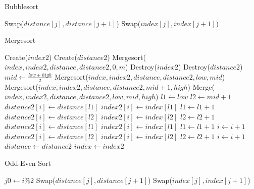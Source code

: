 \documentclass[10pt]{article}
\begin{document}
\begin{algorithm}[H]
\caption{Bubblesort}\label{alg:bubblesort}
\begin{algorithmic}[1]
				\State Swap($distance[j],distance[j+1]$)
				\State Swap($index[j],index[j+1]$)
			\EndIf
		\EndFor
	\EndFor
\EndProcedure
\end{algorithmic}
\end{algorithm}
\begin{algorithm}[H]
\caption{Mergesort}\label{alg:mergesort}
\begin{algorithmic}[1]
	\State Create($index2$)
	\State Create($distance2$)
	\State Mergesort($index,index2,distance,distance2,0,m$)
	\State Destroy($index2$)
	\State Destroy($distance2$)
\EndProcedure
{}
		\State $mid \gets \frac{low+high}{2}$
		\State Mergesort($index,index2,distance,distance2,low,mid$)
		\State Mergesort($index,index2,distance,distance2,mid+1,high$)
		\State Merge($index,index2,distance,distance2,low,mid,high$)
	\EndIf
\EndProcedure
{}
	\State $l1 \gets low$
	\State $l2 \gets mid+1$
			\State $distance2[i] \gets distance[l1]$
			\State $index2[i] \gets index[l1]$
			\State $l1 \gets l1 + 1$
		\Else
			\State $distance2[i] \gets distance[l2]$
			\State $index2[i] \gets index[l2]$
			\State $l2 \gets l2 + 1$
		\EndIf
	\EndFor
		\State $distance2[i] \gets distance[l1]$
		\State $index2[i] \gets index[l1]$
		\State $l1 \gets l1 + 1$
		\State $i \gets i + 1$
	\EndWhile
		\State $distance2[i] \gets distance[l2]$
		\State $index2[i] \gets index[l2]$
		\State $l2 \gets l2 + 1$
		\State $i \gets i + 1$
	\EndWhile
	\State $distance \gets distance2$
	\State $index \gets index2$ 
\EndProcedure
\end{algorithmic}
\end{algorithm}
\begin{algorithm}[H]
\caption{Odd-Even Sort}\label{alg:oddeven}
\begin{algorithmic}[1]
		\State $j0 \gets i \% 2$
				\State Swap($distance[j],distance[j+1]$)
				\State Swap($index[j],index[j+1]$)
			\EndIf
		\EndFor
	\EndFor
\EndProcedure
\end{algorithmic}
\end{algorithm}
\end{document}
